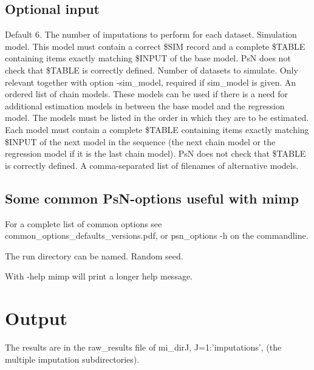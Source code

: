 \pagebreak

\subsection{Optional input}

\begin{optionlist}
Default 6. The number of imputations to perform for each dataset. 
\nextopt
{}
Simulation model. This model must contain a correct \$SIM record and a complete \$TABLE containing items exactly matching \$INPUT of the base model. PsN does not check that \$TABLE is correctly defined. 
\nextopt
{}
Number of datasets to simulate. Only relevant together with option -sim\_model, required if sim\_model is given. 
\nextopt
{}
An ordered list of chain models. These models can be used if there is a need for additional estimation models in between the base model and the regression model. The models must be listed in the order in which they are to be estimated. Each model must contain a complete \$TABLE containing items exactly matching \$INPUT of the next model in the sequence (the next chain model or the regression model if it is the last chain model). PsN does not check that \$TABLE is correctly defined.   
\nextopt
{}
A comma-separated list of filenames of alternative models. 
\nextopt
\end{optionlist}

\subsection{Some common PsN-options useful with mimp}

For a complete list of common options see common\_options\_defaults\_versions.pdf, or psn\_options -h on the commandline.

\begin{optionlist}
The run directory can be named. 
\nextopt
{}
Random seed.

\nextopt
{}
With -help mimp will print a longer help message. 
\nextopt
\end{optionlist}


\section{Output}
The results are in the raw\_results file of mi\_dirJ, J=1:'imputations', (the multiple imputation subdirectories).

